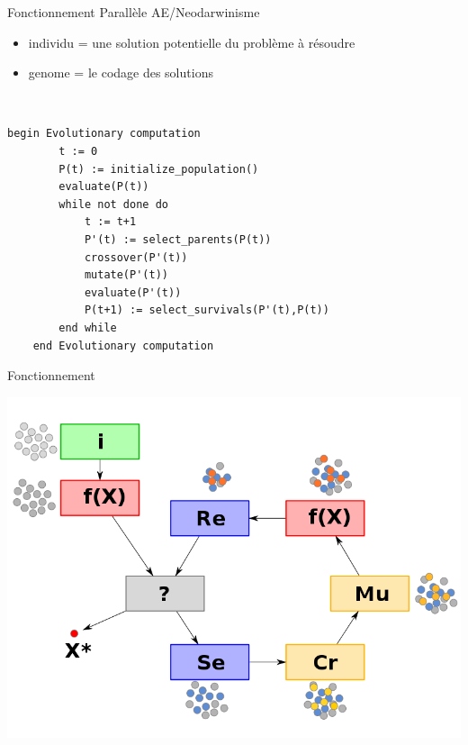 \documentclass{beamer}
\begin{document}
\begin{frame}[fragile]{Fonctionnement}
    Parallèle AE/Neodarwinisme
    \begin{itemize}
        \item individu = une solution potentielle du problème à résoudre
        \item genome = le codage des solutions 
    \end{itemize}
    ~\\
    \begin{lstlisting}[frame=single]
    begin Evolutionary computation
        t := 0
        P(t) := initialize_population() 
        evaluate(P(t))
        while not done do
            t := t+1
            P'(t) := select_parents(P(t))
            crossover(P'(t))
            mutate(P'(t))
            evaluate(P'(t))
            P(t+1) := select_survivals(P'(t),P(t))
        end while
    end Evolutionary computation
    \end{lstlisting}
\end{frame}

\begin{frame}{Fonctionnement}
    \begin{center}
            \includegraphics[width=.80\linewidth]{images/ae}
    \end{center}
\end{frame}
\end{document}
